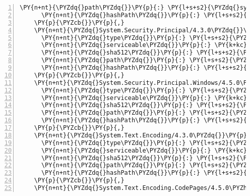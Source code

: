 \begin{Verbatim}[commandchars=\\\{\},numbers=left,firstnumber=1,stepnumber=1,numberblanklines=0]
      \PY{n+nt}{\PYZdq{}path\PYZdq{}}\PY{p}{:} \PY{l+s+s2}{\PYZdq{}system.security.permissions/4.5.0\PYZhy{}rc1\PYZdq{}}\PY{p}{,}
      \PY{n+nt}{\PYZdq{}hashPath\PYZdq{}}\PY{p}{:} \PY{l+s+s2}{\PYZdq{}system.security.permissions.4.5.0\PYZhy{}rc1.nupkg.sha512\PYZdq{}}
    \PY{p}{\PYZcb{}}\PY{p}{,}
    \PY{n+nt}{\PYZdq{}System.Security.Principal/4.3.0\PYZdq{}}\PY{p}{:} \PY{p}{\PYZob{}}
      \PY{n+nt}{\PYZdq{}type\PYZdq{}}\PY{p}{:} \PY{l+s+s2}{\PYZdq{}package\PYZdq{}}\PY{p}{,}
      \PY{n+nt}{\PYZdq{}serviceable\PYZdq{}}\PY{p}{:} \PY{k+kc}{true}\PY{p}{,}
      \PY{n+nt}{\PYZdq{}sha512\PYZdq{}}\PY{p}{:} \PY{l+s+s2}{\PYZdq{}sha512\PYZhy{}I1tkfQlAoMM2URscUtpcRo/hX0jinXx6a/KUtEQoz3owaYwl3qwsO8cbzYVVnjxrzxjHo3nJC+62uolgeGIS9A==\PYZdq{}}\PY{p}{,}
      \PY{n+nt}{\PYZdq{}path\PYZdq{}}\PY{p}{:} \PY{l+s+s2}{\PYZdq{}system.security.principal/4.3.0\PYZdq{}}\PY{p}{,}
      \PY{n+nt}{\PYZdq{}hashPath\PYZdq{}}\PY{p}{:} \PY{l+s+s2}{\PYZdq{}system.security.principal.4.3.0.nupkg.sha512\PYZdq{}}
    \PY{p}{\PYZcb{}}\PY{p}{,}
    \PY{n+nt}{\PYZdq{}System.Security.Principal.Windows/4.5.0\PYZhy{}rc1\PYZdq{}}\PY{p}{:} \PY{p}{\PYZob{}}
      \PY{n+nt}{\PYZdq{}type\PYZdq{}}\PY{p}{:} \PY{l+s+s2}{\PYZdq{}package\PYZdq{}}\PY{p}{,}
      \PY{n+nt}{\PYZdq{}serviceable\PYZdq{}}\PY{p}{:} \PY{k+kc}{true}\PY{p}{,}
      \PY{n+nt}{\PYZdq{}sha512\PYZdq{}}\PY{p}{:} \PY{l+s+s2}{\PYZdq{}sha512\PYZhy{}BKdXbmb7VTmFKsr7k4HSphxFhqwGP7d9RPJL9GW72SFENWFafIoS+hvEDh5VB0uCYY1f1v/UwcE3Yay0fjMZQA==\PYZdq{}}\PY{p}{,}
      \PY{n+nt}{\PYZdq{}path\PYZdq{}}\PY{p}{:} \PY{l+s+s2}{\PYZdq{}system.security.principal.windows/4.5.0\PYZhy{}rc1\PYZdq{}}\PY{p}{,}
      \PY{n+nt}{\PYZdq{}hashPath\PYZdq{}}\PY{p}{:} \PY{l+s+s2}{\PYZdq{}system.security.principal.windows.4.5.0\PYZhy{}rc1.nupkg.sha512\PYZdq{}}
    \PY{p}{\PYZcb{}}\PY{p}{,}
    \PY{n+nt}{\PYZdq{}System.Text.Encoding/4.3.0\PYZdq{}}\PY{p}{:} \PY{p}{\PYZob{}}
      \PY{n+nt}{\PYZdq{}type\PYZdq{}}\PY{p}{:} \PY{l+s+s2}{\PYZdq{}package\PYZdq{}}\PY{p}{,}
      \PY{n+nt}{\PYZdq{}serviceable\PYZdq{}}\PY{p}{:} \PY{k+kc}{true}\PY{p}{,}
      \PY{n+nt}{\PYZdq{}sha512\PYZdq{}}\PY{p}{:} \PY{l+s+s2}{\PYZdq{}sha512\PYZhy{}BiIg+KWaSDOITze6jGQynxg64naAPtqGHBwDrLaCtixsa5bKiR8dpPOHA7ge3C0JJQizJE+sfkz1wV+BAKAYZw==\PYZdq{}}\PY{p}{,}
      \PY{n+nt}{\PYZdq{}path\PYZdq{}}\PY{p}{:} \PY{l+s+s2}{\PYZdq{}system.text.encoding/4.3.0\PYZdq{}}\PY{p}{,}
      \PY{n+nt}{\PYZdq{}hashPath\PYZdq{}}\PY{p}{:} \PY{l+s+s2}{\PYZdq{}system.text.encoding.4.3.0.nupkg.sha512\PYZdq{}}
    \PY{p}{\PYZcb{}}\PY{p}{,}
    \PY{n+nt}{\PYZdq{}System.Text.Encoding.CodePages/4.5.0\PYZhy{}rc1\PYZdq{}}\PY{p}{:} \PY{p}{\PYZob{}}

\end{Verbatim}
